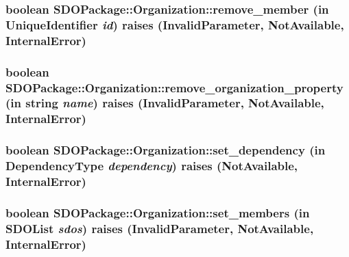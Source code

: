 \subsubsection[{remove\_\-member}]{\setlength{\rightskip}{0pt plus 5cm}boolean SDOPackage::Organization::remove\_\-member (in {\bf UniqueIdentifier} {\em id})  raises (InvalidParameter, NotAvailable, InternalError)}\label{interfaceSDOPackage_1_1Organization_a8ba50b5da77d6354b2869e7da3bd7bfc}
\subsubsection[{remove\_\-organization\_\-property}]{\setlength{\rightskip}{0pt plus 5cm}boolean SDOPackage::Organization::remove\_\-organization\_\-property (in string {\em name})  raises (InvalidParameter, NotAvailable, InternalError)}\label{interfaceSDOPackage_1_1Organization_a16712f0f6513b226cb5428f89a63c00a}
\subsubsection[{set\_\-dependency}]{\setlength{\rightskip}{0pt plus 5cm}boolean SDOPackage::Organization::set\_\-dependency (in {\bf DependencyType} {\em dependency})  raises (NotAvailable, InternalError)}\label{interfaceSDOPackage_1_1Organization_ab0d8070846673145e46508640e8d36e1}
\subsubsection[{set\_\-members}]{\setlength{\rightskip}{0pt plus 5cm}boolean SDOPackage::Organization::set\_\-members (in {\bf SDOList} {\em sdos})  raises (InvalidParameter, NotAvailable, InternalError)}\label{interfaceSDOPackage_1_1Organization_a4b4dc833033b64539eb3ce92485b3e41}
